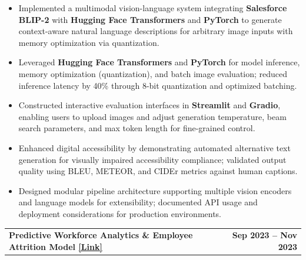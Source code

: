 \documentclass[10pt,a4paper]{article}
\makeatletter
\newcommand{\entry}[2]{%
    \noindent
    \begin{tabularx}{\linewidth}{@{}X r@{}}
        \textbf{#1} & \textbf{#2}
    \end{tabularx}
    \vspace{-2pt}
}
\makeatother
\begin{document}
\begin{itemize}

\item Implemented a multimodal vision-language system integrating \textbf{Salesforce BLIP-2} with \textbf{Hugging Face Transformers} and \textbf{PyTorch} to generate context-aware natural language descriptions for arbitrary image inputs with memory optimization via quantization.

\item Leveraged \textbf{Hugging Face Transformers} and \textbf{PyTorch} for model inference, memory optimization (quantization), and batch image evaluation; reduced inference latency by 40\% through 8-bit quantization and optimized batching.

\item Constructed interactive evaluation interfaces in \textbf{Streamlit} and \textbf{Gradio}, enabling users to upload images and adjust generation temperature, beam search parameters, and max token length for fine-grained control.

\item Enhanced digital accessibility by demonstrating automated alternative text generation for visually impaired accessibility compliance; validated output quality using BLEU, METEOR, and CIDEr metrics against human captions.

\item Designed modular pipeline architecture supporting multiple vision encoders and language models for extensibility; documented API usage and deployment considerations for production environments.

\end{itemize}

\vspace{1pt}

\entry
{Predictive Workforce Analytics \& Employee Attrition Model
\hspace{2pt}
\href{https://github.com/marideharshith21}
{\textcolor{linkblue}{[Link]}}}
{Sep 2023 -- Nov 2023}
\end{document}
